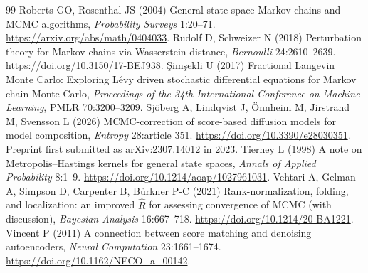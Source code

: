 \documentclass[pdflatex,iicol,sn-mathphys-ay]{sn-jnl}
\theoremstyle{definition}\newtheorem{definition}[theorem]{Definition}
\theoremstyle{remark}\newtheorem{remark}[theorem]{Remark}
\numberwithin{equation}{section}
\newcommand{\1}{\mathbf 1}
\begin{document}
\begin{thebibliography}{99}
 Roberts GO, Rosenthal JS (2004) General state space Markov chains and MCMC algorithms,
\emph{Probability Surveys} 1:20--71. \url{https://arxiv.org/abs/math/0404033}.
 Rudolf D, Schweizer N (2018) Perturbation theory for Markov chains via Wasserstein distance, \emph{Bernoulli} 24:2610--2639. \url{https://doi.org/10.3150/17-BEJ938}.
 \c{S}im\c{s}ekli U (2017) Fractional Langevin Monte Carlo: Exploring L\'evy driven stochastic differential equations for Markov chain Monte Carlo,
\emph{Proceedings of the 34th International Conference on Machine Learning}, PMLR 70:3200--3209.
 Sj\"oberg A, Lindqvist J, \"Onnheim M, Jirstrand M, Svensson L (2026) MCMC-correction of score-based diffusion models for model composition,
\emph{Entropy} 28:article 351. \url{https://doi.org/10.3390/e28030351}. Preprint first submitted as arXiv:2307.14012 in 2023.
 Tierney L (1998) A note on Metropolis--Hastings kernels for general state spaces,
\emph{Annals of Applied Probability} 8:1--9. \url{https://doi.org/10.1214/aoap/1027961031}.
 Vehtari A, Gelman A, Simpson D, Carpenter B, B\"urkner P-C (2021) Rank-normalization, folding, and localization: an improved $\widehat R$ for assessing convergence of MCMC (with discussion), \emph{Bayesian Analysis} 16:667--718. \url{https://doi.org/10.1214/20-BA1221}.
 Vincent P (2011) A connection between score matching and denoising autoencoders,
\emph{Neural Computation} 23:1661--1674. \url{https://doi.org/10.1162/NECO_a_00142}.
\end{thebibliography}
\end{document}
